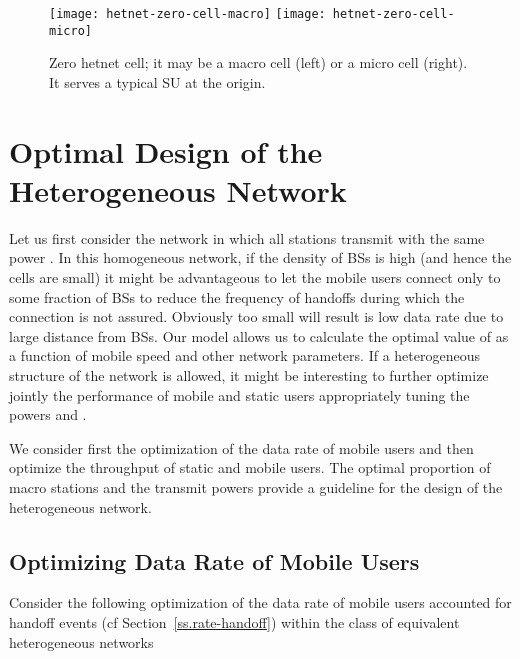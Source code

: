 \documentclass[10pt,journal]{IEEEtran}
\begin{document}
\begin{figure}[t!]
\begin{center}
\begin{minipage}{1\linewidth}
\begin{center}
\centerline{\texttt{[image: hetnet-zero-cell-macro]}
\hspace{0.03\linewidth}
\texttt{[image: hetnet-zero-cell-micro]}}
\vspace{-2ex}
\caption[Zero hetnet cell]{Zero hetnet cell; it may be a macro cell (left) or a micro cell (right).
It serves a typical SU at the origin.
\label{fig:hetnet-zero-cell-macro}}
\end{center}
\end{minipage}
\end{center}
\vspace{-2ex}
\end{figure}






\section{Optimal Design of the Heterogeneous Network}\label{section:optimal-design-of-the-network-using-stochastic-geometry}
Let us first consider the network in  which all stations transmit with the same power . In this
homogeneous network, if the density of BSs  is high (and
hence the cells are small) it might be advantageous to let the mobile users
connect only to some fraction  of BSs to reduce the frequency
of handoffs during which  the connection is
not assured. Obviously too small   will result is low data rate 
due to large distance from BSs. Our model
allows us to calculate the optimal value of  as a  function of mobile
speed  and other network parameters. 
If a heterogeneous structure of the  network is allowed, it might be interesting to
further optimize jointly the performance of mobile and static  users
appropriately tuning the powers   and . 

We consider first the optimization of the data rate of mobile users
and then optimize the throughput of static and mobile users.
The optimal proportion of macro stations and the transmit powers
provide a guideline for the design of the heterogeneous network. 


\subsection{Optimizing Data Rate of Mobile Users}
\label{subsection:the-optimization-problem}
\label{subsubsection:optimization-problem-with-only-mobile-node-data-rate}
Consider the following  optimization of the data rate of mobile users
accounted for handoff events (cf Section~\ref{ss.rate-handoff}) 
within the class of equivalent
heterogeneous networks
\end{document}
